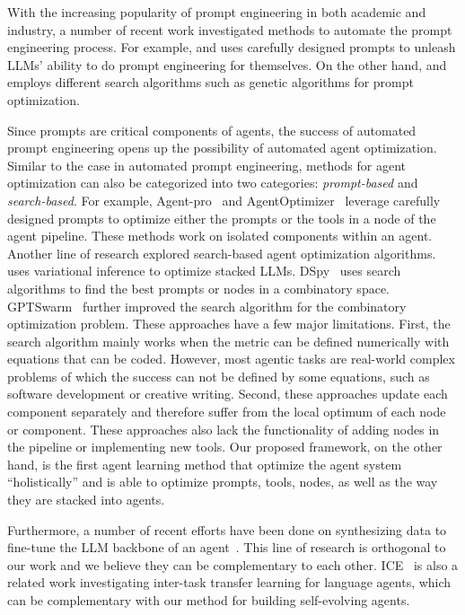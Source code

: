 With the increasing popularity of prompt engineering in both academic and industry, a number of recent work investigated methods to automate the prompt engineering process. For example, \citet{pryzant2020automatically} and \citet{yang2024large} uses carefully designed prompts to unleash LLMs' ability to do prompt engineering for themselves. On the other hand, \citet{prasad-etal-2023-grips} and \citet{guo2024connecting} employs different search algorithms such as genetic algorithms for prompt optimization.

Since prompts are critical components of agents, the success of automated prompt engineering opens up the possibility of automated agent optimization. Similar to the case in automated prompt engineering, methods for agent optimization can also be categorized into two categories: \textit{prompt-based} and \textit{search-based}. For example, Agent-pro~\citep{zhang2024agentpro} and AgentOptimizer~\citep{zhang2024offline} leverage carefully designed prompts to optimize either the prompts or the tools in a node of the agent pipeline. These methods work on isolated components within an agent. Another line of research explored search-based agent optimization algorithms. ~\citet{sordoni2023joint} uses variational inference to optimize stacked LLMs. DSpy~\citep{khattab2023dspy} uses search algorithms to find the best prompts or nodes in a combinatory space. GPTSwarm~\citep{zhuge2024language} further improved the search algorithm for the combinatory optimization problem. These approaches have a few major limitations. First, the search algorithm mainly works when the metric can be defined numerically with equations that can be coded. However, most agentic tasks are real-world complex problems of which the success can not be defined by some equations, such as software development or creative writing. Second, these approaches update each component separately and therefore suffer from the local optimum of each node or component. These approaches also lack the functionality of adding nodes in the pipeline or implementing new tools.  Our proposed \baby framework, on the other hand, is the first agent learning method that optimize the agent system ``holistically'' and is able to optimize prompts, tools, nodes, as well as the way they are stacked into agents. 

Furthermore, a number of recent efforts have been done on synthesizing data to fine-tune the LLM backbone of an agent~\citep{chen2023fireact,DBLP:journals/corr/abs-2401-05268,song2024trial}. This line of research is orthogonal to our work and we believe they can be complementary to each other. ICE~\citep{qian2024investigateconsolidateexploit} is also a related work investigating inter-task transfer learning for language agents, which can be complementary with our method for building self-evolving agents.
